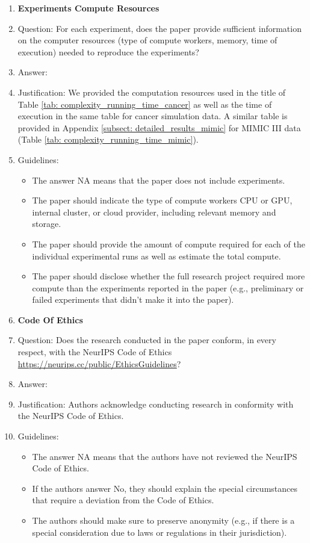 \documentclass{article}
\theoremstyle{plain}
\theoremstyle{definition}
\theoremstyle{remark}
\begin{document}
\begin{enumerate}
\item {\bf Experiments Compute Resources}
    \item[] Question: For each experiment, does the paper provide sufficient information on the computer resources (type of compute workers, memory, time of execution) needed to reproduce the experiments?
    \item[] Answer: \answerYes{}{} %
    \item[] Justification: We provided the computation resources used in the title of Table \ref{tab: complexity_running_time_cancer} as well as the time of execution in the same table for cancer simulation data. A similar table is provided in Appendix \ref{subsect: detailed_results_mimic} for MIMIC III data (Table \ref{tab: complexity_running_time_mimic}).
    \item[] Guidelines:
    \begin{itemize}
        \item The answer NA means that the paper does not include experiments.
        \item The paper should indicate the type of compute workers CPU or GPU, internal cluster, or cloud provider, including relevant memory and storage.
        \item The paper should provide the amount of compute required for each of the individual experimental runs as well as estimate the total compute. 
        \item The paper should disclose whether the full research project required more compute than the experiments reported in the paper (e.g., preliminary or failed experiments that didn't make it into the paper). 
    \end{itemize}
    
\item {\bf Code Of Ethics}
    \item[] Question: Does the research conducted in the paper conform, in every respect, with the NeurIPS Code of Ethics \url{https://neurips.cc/public/EthicsGuidelines}?
    \item[] Answer: \answerYes{} %
    \item[] Justification:  Authors acknowledge conducting research in conformity with the NeurIPS Code of Ethics.
    \item[] Guidelines:
    \begin{itemize}
        \item The answer NA means that the authors have not reviewed the NeurIPS Code of Ethics.
        \item If the authors answer No, they should explain the special circumstances that require a deviation from the Code of Ethics.
        \item The authors should make sure to preserve anonymity (e.g., if there is a special consideration due to laws or regulations in their jurisdiction).
    \end{itemize}



\end{enumerate}
\end{document}
